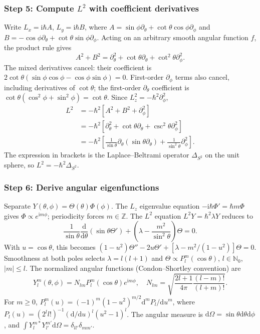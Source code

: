 \documentclass[11pt,a4paper]{article}
\newcommand{\dd}{\mathrm{d}}
\newcommand{\iu}{\mathrm{i}}
\newcommand{\p}{\partial}
\begin{document}
\subsubsection*{Step 5: Compute \texorpdfstring{$L^2$}{L squared} with coefficient derivatives}
Write \(L_x=\iu\hbar A\), \(L_y=\iu\hbar B\), where \(A=\sin\phi\p_\theta+\cot\theta\cos\phi\p_\phi\) and \(B=-\cos\phi\p_\theta+\cot\theta\sin\phi\p_\phi\). Acting on an arbitrary smooth angular function \(f\), the product rule gives
\begin{equation}A^2+B^2=\p_\theta^2+\cot\theta\p_\theta+\cot^2\theta\p_\phi^2.\end{equation}
The mixed derivatives cancel: their coefficient is \(2\cot\theta(\sin\phi\cos\phi-\cos\phi\sin\phi)=0\). First-order \(\p_\phi\) terms also cancel, including derivatives of \(\cot\theta\); the first-order \(\p_\theta\) coefficient is \(\cot\theta(\cos^2\phi+\sin^2\phi)=\cot\theta\). Since \(L_z^2=-\hbar^2\p_\phi^2\),
\begin{align}
L^2&=-\hbar^2[A^2+B^2+\p_\phi^2]\\
&=-\hbar^2\left[\p_\theta^2+\cot\theta\p_\theta+\csc^2\theta\p_\phi^2\right]\\
&=\boxed{-\hbar^2\left[\frac1{\sin\theta}\p_\theta(\sin\theta\p_\theta)+\frac1{\sin^2\theta}\p_\phi^2\right]}.
\end{align}
The expression in brackets is the Laplace--Beltrami operator \(\Delta_{S^2}\) on the unit sphere, so \(L^2=-\hbar^2\Delta_{S^2}\).

\subsubsection*{Step 6: Derive angular eigenfunctions}
Separate \(Y(\theta,\phi)=\Theta(\theta)\Phi(\phi)\). The \(L_z\) eigenvalue equation \(-\iu\hbar\Phi'=\hbar m\Phi\) gives \(\Phi\propto e^{\iu m\phi}\); periodicity forces \(m\in\mathbb Z\). The \(L^2\) equation \(L^2Y=\hbar^2\lambda Y\) reduces to
\begin{equation}\frac1{\sin\theta}\frac{\dd}{\dd\theta}(\sin\theta\Theta')+\left(\lambda-\frac{m^2}{\sin^2\theta}\right)\Theta=0.\end{equation}
With \(u=\cos\theta\), this becomes \((1-u^2)\Theta''-2u\Theta'+[\lambda-m^2/(1-u^2)]\Theta=0\). Smoothness at both poles selects \(\lambda=l(l+1)\) and \(\Theta\propto P_l^m(\cos\theta)\), \(l\in\mathbb N_0\), \(|m|\le l\). The normalized angular functions (Condon--Shortley convention) are
\begin{equation}\boxed{Y_l^m(\theta,\phi)=N_{lm}P_l^m(\cos\theta)e^{\iu m\phi},\quad N_{lm}=\sqrt{\frac{2l+1}{4\pi}\frac{(l-m)!}{(l+m)!}}.}\end{equation}
For \(m\ge0\), \(P_l^m(u)=(-1)^m(1-u^2)^{m/2}\dd^mP_l/\dd u^m\), where \(P_l(u)=(2^ll!)^{-1}(\dd/\dd u)^l(u^2-1)^l\). The angular measure is \(\dd\Omega=\sin\theta\dd\theta\dd\phi\), and \(\int Y_l^{m*}Y_{l'}^{m'}\dd\Omega=\delta_{ll'}\delta_{mm'}\).
\end{document}
